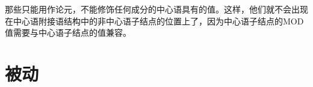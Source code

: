 那些只能用作论元，不能修饰任何成分的中心语具有的\modvc 值。这样，他们就不会出现在中心语附接语结构中的非中心语子结点的位置上了，因为中心语子结点的MOD值需要与中心语子结点的\synsemc 值兼容。

\section{被动}
\label{Abschnitt-HPSG-Passiv}\label{sec-hpsg-passive}

